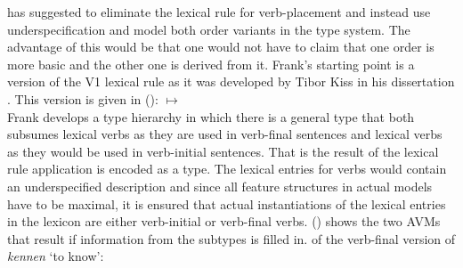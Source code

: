 \begin{exe}
\begin{xlist}
\citet{Frank94} has suggested to eliminate the lexical rule for verb-placement and instead use
underspecification and model both order variants in the type system. The advantage of this would be
that one would not have to claim that one order is more basic and the other one is derived from
it. Frank's starting point is a version of the V1 lexical rule as it was developed by Tibor Kiss in
his dissertation \citep[]{Kiss93}. This version is given in ():
\eas
{}
$\mapsto$\\
\zs
Frank develops a type hierarchy in which there is a general type that both subsumes lexical verbs as
they are used in verb-final sentences and lexical verbs as they would be used in verb-initial
sentences. That is the result of the lexical rule application is encoded as a type. The lexical
entries for verbs would contain an underspecified description and since all feature structures in
actual models have to be maximal, it is ensured that actual instantiations of the lexical entries in
the lexicon are either verb-initial or verb-final verbs. () shows the two AVMs that result if
information from the subtypes is filled in.
\eal
\ex \locv of the verb-final version of \emph{kennen} `to know':
\end{xlist}
\end{exe}
